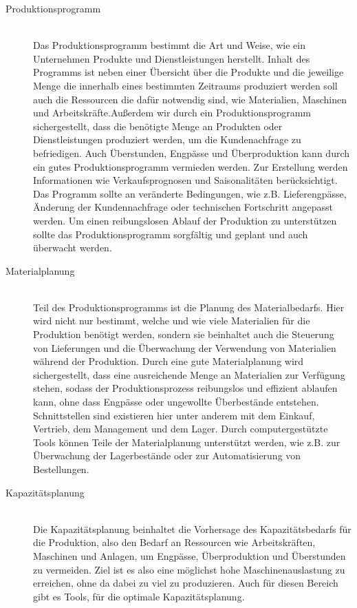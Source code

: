 \documentclass[a4paper,12pt, german]{report}
\begin{document}
\begin{description}
  \item[Produktionsprogramm]\hfill \\ 
  Das Produktionsprogramm bestimmt die Art und Weise, wie ein Unternehmen Produkte und Dienstleistungen herstellt. Inhalt des Programms ist neben einer Übersicht über die Produkte und die jeweilige Menge die innerhalb eines bestimmten Zeitraums produziert werden soll auch die Ressourcen die dafür notwendig sind, wie Materialien, Maschinen und Arbeitskräfte.Außerdem wir durch ein Produktionsprogramm sichergestellt, dass die benötigte Menge an Produkten oder Dienstleistungen produziert werden, um die Kundenachfrage zu befriedigen. Auch Überstunden, Engpässe und Überproduktion kann durch ein gutes Produktionsprogramm vermieden werden. 
  Zur Erstellung werden Informationen wie Verkaufsprognosen und Saisonalitäten berücksichtigt. Das Programm sollte an veränderte Bedingungen, wie z.B. Lieferengpässe, Änderung der Kundennachfrage oder technischen Fortschritt angepasst werden.
  Um einen reibungslosen Ablauf der Produktion zu unterstützen sollte das Produktionsprogramm sorgfältig und geplant und auch überwacht werden.

  \item[Materialplanung]\hfill \\ 
  Teil des Produktionsprogramms ist die Planung des Materialbedarfs. Hier wird nicht nur bestimmt, welche und wie viele Materialien für die Produktion benötigt werden, sondern sie beinhaltet auch die Steuerung von Lieferungen und die Überwachung der Verwendung von Materialien während der Produktion.
  Durch eine gute Materialplanung wird sichergestellt, dass eine ausreichende Menge an Materialien zur Verfügung stehen, sodass der Produktionsprozess reibungslos und effizient ablaufen kann, ohne dass Engpässe oder ungewollte Überbestände entstehen. Schnittstellen sind existieren hier unter anderem mit dem Einkauf, Vertrieb, dem Management und dem Lager. Durch computergestützte Tools können Teile der Materialplanung unterstützt werden, wie z.B. zur Überwachung der Lagerbestände oder zur Automatisierung von Bestellungen. 

  \item[Kapazitätsplanung]\hfill \\ 
  Die Kapazitätsplanung beinhaltet die Vorhersage des Kapazitätsbedarfs für die Produktion, also den Bedarf an Ressourcen wie Arbeitskräften, Maschinen und Anlagen, um Engpässe, Überproduktion und Überstunden zu vermeiden. Ziel ist es also eine möglichst hohe Maschinenauslastung zu erreichen, ohne da dabei zu viel zu produzieren. Auch für diesen Bereich gibt es Tools, für die optimale Kapazitätsplanung.


\end{description}
\end{document}

